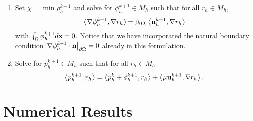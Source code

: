 \documentclass[letterpaper]{erdc}
\begin{document}
\begin{enumerate}
\item Set $\chi = \min \rho_h^{k+1}$ and solve for $\phi_h^{k+1}\in M_h$ such that for all $r_h\in M_h$,
\begin{equation}
 \left\langle \nabla \phi_h^{k+1}, \nabla r_h \right\rangle = \beta_0 \chi \left\langle \textbf{u}_h^{k+1}, \nabla r_h \right\rangle
\end{equation}
with $\int_{\Omega}\phi_h^{k+1}d\textbf{x} = 0$.  Notice that we have incorporated the natural boundary condition $\left.\nabla\phi_h^{k+1}\cdot\textbf{n}\right|_{\partial\Omega} = 0 $ already in this formulation.  

\item Solve for $p_h^{k+1}\in M_h$ such that for all $r_h\in M_h$
\begin{equation}
  \left\langle p_h^{k+1}, r_h \right\rangle = \left\langle p_h^k + \phi_h^{k+1}, r_h \right\rangle + \left\langle \mu \textbf{u}_h^{k+1}, \nabla r_h \right\rangle.
\end{equation}
\end{enumerate}



%
%
%
\section{Numerical Results}\label{sec:NumericalResults}
\end{document}

